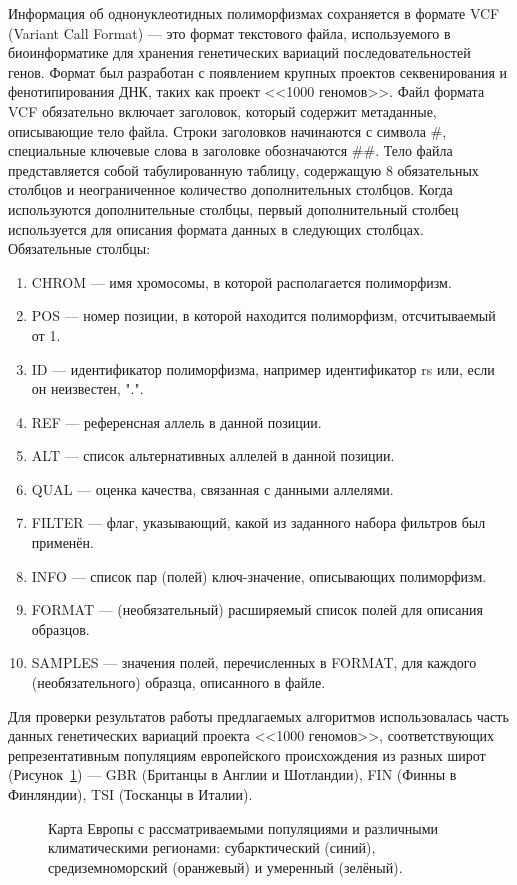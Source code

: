 Информация об однонуклеотидных полиморфизмах сохраняется в формате VCF (Variant Call Format) --- это формат текстового файла, используемого в биоинформатике для хранения генетических вариаций последовательностей генов. Формат был разработан с появлением крупных проектов секвенирования и фенотипирования ДНК, таких как проект <<1000 геномов>>. Файл формата VCF обязательно включает заголовок, который содержит метаданные, описывающие тело файла. Строки заголовков начинаются с символа $\#$, специальные ключевые слова в заголовке обозначаются $\#\#$. Тело файла представляется собой табулированную таблицу, содержащую 8 обязательных столбцов и неограниченное количество дополнительных столбцов. Когда используются дополнительные столбцы, первый дополнительный столбец используется для описания формата данных в следующих столбцах. Обязательные столбцы:
\begin{enumerate}
	\item CHROM --- имя хромосомы, в которой располагается полиморфизм. 
	\item POS --- номер позиции, в которой находится полиморфизм, отсчитываемый от 1.
	\item ID --- идентификатор полиморфизма, например идентификатор rs или, если он неизвестен, ".".
	\item REF --- референсная аллель в данной позиции.
	\item ALT --- список альтернативных аллелей в данной позиции.
	\item QUAL --- оценка качества, связанная с данными аллелями.
	\item FILTER --- флаг, указывающий, какой из заданного набора фильтров был применён.
	\item INFO --- список пар (полей) ключ-значение, описывающих полиморфизм. 
	\item FORMAT --- (необязательный) расширяемый список полей для описания образцов.
	\item SAMPLES --- значения полей, перечисленных в FORMAT, для каждого (необязательного) образца, описанного в файле.
\end{enumerate}

Для проверки результатов работы предлагаемых алгоритмов использовалась часть данных генетических вариаций проекта <<1000 геномов>>, соответствующих репрезентативным популяциям европейского происхождения из разных широт (Рисунок~\ref{fig:europe_map}) --- GBR (Британцы в Англии и Шотландии), FIN (Финны в Финляндии), TSI (Тосканцы в Италии).

\begin{figure}[ht]
	\caption{Карта Европы с рассматриваемыми популяциями и различными климатическими регионами: субарктический (синий), средиземноморский (оранжевый) и умеренный (зелёный).}\label{fig:europe_map}
\end{figure}

